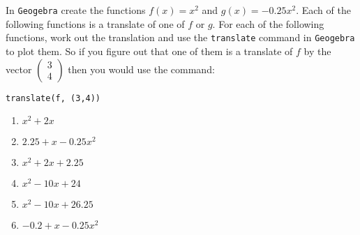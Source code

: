 \documentclass{article}
\begin{document}

In \texttt{Geogebra} create the functions \(f(x) = x^2\) and \(g(x) = -0.25 x^2\).
Each of the following functions is a translate of one of \(f\) or \(g\).
For each of the following functions, work out the translation and use the \texttt{translate} command in \texttt{Geogebra} to plot them.
So if you figure out that one of them is a translate of \(f\) by the vector \(\begin{pmatrix} 3 \\ 4\end{pmatrix}\) then you would use the command:

\begin{verbatim}
translate(f, (3,4))
\end{verbatim}

\begin{enumerate}
\item \(x^2 + 2 x\)
\item \(2.25 + x - 0.25 x^2\)
\item \(x^2 + 2 x + 2.25\)
\item \(x^2 - 10 x + 24\)
\item \(x^2 - 10 x + 26.25\)
\item \(-0.2 + x - 0.25 x^2\)
\end{enumerate}
\end{document}
